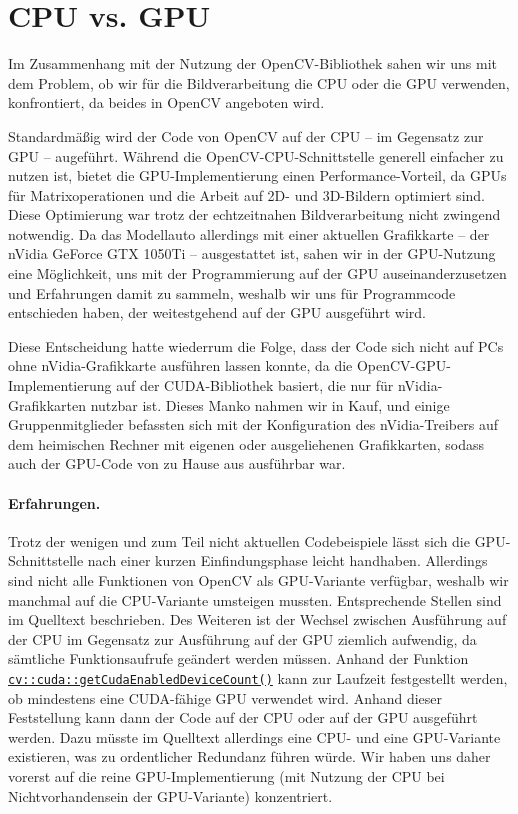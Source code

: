 \documentclass[a4paper,12pt]{report}
\begin{document}
\section{CPU vs. GPU}
	Im Zusammenhang mit der Nutzung der OpenCV-Bibliothek sahen wir uns mit dem Problem, ob wir für die Bildverarbeitung die CPU oder die GPU verwenden, konfrontiert, da beides in OpenCV angeboten wird.

	Standardmäßig wird der Code von OpenCV auf der CPU -- im Gegensatz zur GPU -- augeführt.
	Während die OpenCV-CPU-Schnittstelle generell einfacher zu nutzen ist, bietet die GPU-Implementierung einen Performance-Vorteil, da GPUs für Matrixoperationen und die Arbeit auf 2D- und 3D-Bildern optimiert sind.
	Diese Optimierung war trotz der echtzeitnahen Bildverarbeitung nicht zwingend notwendig.
	Da das Modellauto allerdings mit einer aktuellen Grafikkarte -- der nVidia GeForce GTX 1050Ti -- ausgestattet ist, sahen wir in der GPU-Nutzung eine Möglichkeit, uns mit der Programmierung auf der GPU auseinanderzusetzen und Erfahrungen damit zu sammeln, weshalb wir uns für Programmcode entschieden haben, der weitestgehend auf der GPU ausgeführt wird.

	Diese Entscheidung hatte wiederrum die Folge, dass der Code sich nicht auf PCs ohne nVidia-Grafikkarte ausführen lassen konnte, da die OpenCV-GPU-Implementierung auf der CUDA-Bibliothek basiert, die nur für nVidia-Grafikkarten nutzbar ist.
	Dieses Manko nahmen wir in Kauf, und einige Gruppenmitglieder befassten sich mit der Konfiguration des nVidia-Treibers auf dem heimischen Rechner mit eigenen oder ausgeliehenen Grafikkarten, sodass auch der GPU-Code von zu Hause aus ausführbar war.

	\paragraph{Erfahrungen.}
	Trotz der wenigen und zum Teil nicht aktuellen Codebeispiele lässt sich die GPU-Schnittstelle nach einer kurzen Einfindungsphase leicht handhaben. Allerdings sind nicht alle Funktionen von OpenCV als GPU-Variante verfügbar, weshalb wir manchmal auf die CPU-Variante umsteigen mussten. Entsprechende Stellen sind im Quelltext beschrieben. Des Weiteren ist der Wechsel zwischen Ausführung auf der CPU im Gegensatz zur Ausführung auf der GPU ziemlich aufwendig, da sämtliche Funktionsaufrufe geändert werden müssen. Anhand der Funktion \hyperlink{https://docs.opencv.org/trunk/d8/d40/group\_\_cudacore\_\_init.html\#gaaa93892f9189163e5d53790b4b1e88db}{\texttt{cv::cuda::getCudaEnabled\-DeviceCount()}} kann zur Laufzeit festgestellt werden, ob mindestens eine CUDA-fähige GPU verwendet wird. Anhand dieser Feststellung kann dann der Code auf der CPU oder auf der GPU ausgeführt werden. Dazu müsste im Quelltext allerdings eine CPU- und eine GPU-Variante existieren, was zu ordentlicher Redundanz führen würde. Wir haben uns daher vorerst auf die reine GPU-Implementierung (mit Nutzung der CPU bei Nichtvorhandensein der GPU-Variante) konzentriert.
\end{document}
